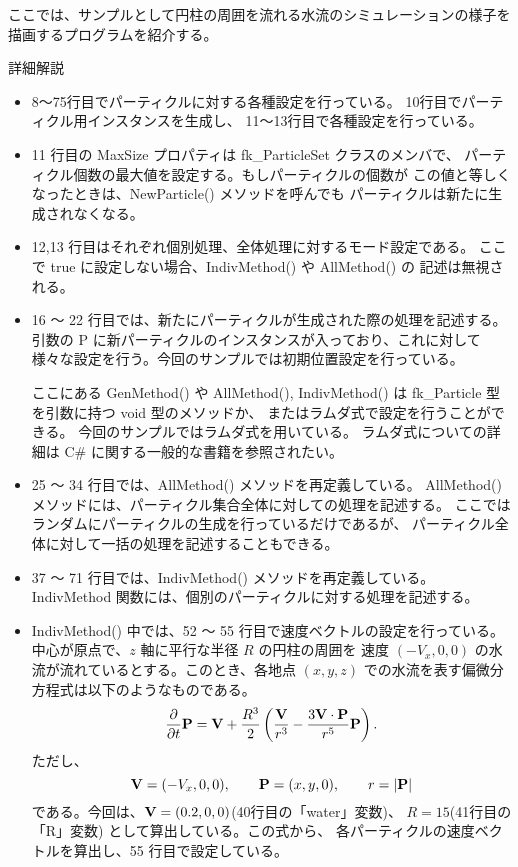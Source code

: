 ここでは、サンプルとして円柱の周囲を流れる水流のシミュレーションの様子を
描画するプログラムを紹介する。
\begin{center}
詳細解説
\end{center}
\begin{itemize}
 \item 8〜75行目でパーティクルに対する各種設定を行っている。
	10行目でパーティクル用インスタンスを生成し、
	11〜13行目で各種設定を行っている。

 \item 11 行目の MaxSize プロパティは fk\_ParticleSet クラスのメンバで、
	パーティクル個数の最大値を設定する。もしパーティクルの個数が
	この値と等しくなったときは、NewParticle() メソッドを呼んでも
	パーティクルは新たに生成されなくなる。

 \item 12,13 行目はそれぞれ個別処理、全体処理に対するモード設定である。
	ここで true に設定しない場合、IndivMethod() や AllMethod() の
	記述は無視される。

 \item 16 〜 22 行目では、新たにパーティクルが生成された際の処理を記述する。
	引数の P に新パーティクルのインスタンスが入っており、これに対して
	様々な設定を行う。今回のサンプルでは初期位置設定を行っている。

	ここにある GenMethod() や AllMethod(), IndivMethod() は
	fk\_Particle 型を引数に持つ void 型のメソッドか、
	またはラムダ式で設定を行うことができる。
	今回のサンプルではラムダ式を用いている。
	ラムダ式についての詳細は C\# に関する一般的な書籍を参照されたい。

 \item 25 〜 34 行目では、AllMethod() メソッドを再定義している。
	AllMethod() メソッドには、パーティクル集合全体に対しての処理を記述する。
	ここではランダムにパーティクルの生成を行っているだけであるが、
	パーティクル全体に対して一括の処理を記述することもできる。

 \item 37 〜 71 行目では、IndivMethod() メソッドを再定義している。
	IndivMethod 関数には、個別のパーティクルに対する処理を記述する。

 \item IndivMethod() 中では、52 〜 55 行目で速度ベクトルの設定を行っている。
	中心が原点で、\(z\) 軸に平行な半径 \(R\) の円柱の周囲を
	速度 \((-V_x, 0, 0)\) の水流が流れているとする。このとき、各地点
	\((x, y, z)\) での水流を表す偏微分方程式は以下のようなものである。
	\begin{equation}
		\frac{\partial}{\partial t}\mathbf{P} =
		\mathbf{V} + \frac{R^3}{2}
		\left(\frac{\mathbf{V}}{r^3} -
		\frac{3 \mathbf{V} \cdot \mathbf{P}}{r^5} \mathbf{P} \right) .
	\end{equation}
	ただし、
	\begin{equation}
		\mathbf{V} = (-V_x, 0, 0), \qquad
		\mathbf{P} = (x, y, 0), \qquad r = |\mathbf{P}|
	\end{equation}
	である。今回は、\(\mathbf{V} = (0.2, 0, 0)\)(40行目の「water」変数)、
	\(R = 15\)(41行目の「R」変数) として算出している。この式から、
	各パーティクルの速度ベクトルを算出し、55 行目で設定している。


\end{itemize}
